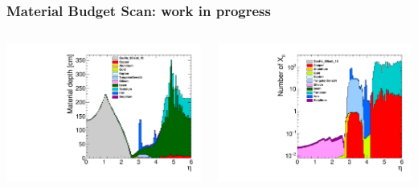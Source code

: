 \documentclass[hyperref={colorlinks=true,pdfpagelabels=false,linkcolor=black}, xcolor=dvipsnames,10pt]{beamer}
\begin{document}
\begin{frame}
	\frametitle{Material Budget Scan: work in progress}
	
	\begin{columns}
	\centering
	\includegraphics[width=\textwidth]{../figures/material/depthpos.pdf}
	
	\centering
	\includegraphics[width=\textwidth]{../figures/material/x0pos.pdf}
  \end{columns}
\end{frame}
\end{document}
